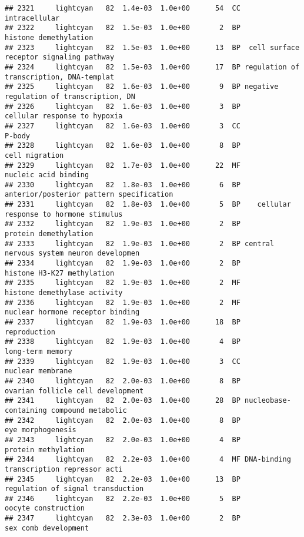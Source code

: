 \documentclass[]{article}
\begin{document}
\begin{verbatim}
## 2321     lightcyan   82  1.4e-03  1.0e+00      54  CC                            intracellular
## 2322     lightcyan   82  1.5e-03  1.0e+00       2  BP                    histone demethylation
## 2323     lightcyan   82  1.5e-03  1.0e+00      13  BP  cell surface receptor signaling pathway
## 2324     lightcyan   82  1.5e-03  1.0e+00      17  BP regulation of transcription, DNA-templat
## 2325     lightcyan   82  1.6e-03  1.0e+00       9  BP negative regulation of transcription, DN
## 2326     lightcyan   82  1.6e-03  1.0e+00       3  BP             cellular response to hypoxia
## 2327     lightcyan   82  1.6e-03  1.0e+00       3  CC                                   P-body
## 2328     lightcyan   82  1.6e-03  1.0e+00       8  BP                           cell migration
## 2329     lightcyan   82  1.7e-03  1.0e+00      22  MF                     nucleic acid binding
## 2330     lightcyan   82  1.8e-03  1.0e+00       6  BP anterior/posterior pattern specification
## 2331     lightcyan   82  1.8e-03  1.0e+00       5  BP    cellular response to hormone stimulus
## 2332     lightcyan   82  1.9e-03  1.0e+00       2  BP                    protein demethylation
## 2333     lightcyan   82  1.9e-03  1.0e+00       2  BP central nervous system neuron developmen
## 2334     lightcyan   82  1.9e-03  1.0e+00       2  BP               histone H3-K27 methylation
## 2335     lightcyan   82  1.9e-03  1.0e+00       2  MF             histone demethylase activity
## 2336     lightcyan   82  1.9e-03  1.0e+00       2  MF         nuclear hormone receptor binding
## 2337     lightcyan   82  1.9e-03  1.0e+00      18  BP                             reproduction
## 2338     lightcyan   82  1.9e-03  1.0e+00       4  BP                         long-term memory
## 2339     lightcyan   82  1.9e-03  1.0e+00       3  CC                         nuclear membrane
## 2340     lightcyan   82  2.0e-03  1.0e+00       8  BP        ovarian follicle cell development
## 2341     lightcyan   82  2.0e-03  1.0e+00      28  BP nucleobase-containing compound metabolic
## 2342     lightcyan   82  2.0e-03  1.0e+00       8  BP                        eye morphogenesis
## 2343     lightcyan   82  2.0e-03  1.0e+00       4  BP                      protein methylation
## 2344     lightcyan   82  2.2e-03  1.0e+00       4  MF DNA-binding transcription repressor acti
## 2345     lightcyan   82  2.2e-03  1.0e+00      13  BP        regulation of signal transduction
## 2346     lightcyan   82  2.2e-03  1.0e+00       5  BP                      oocyte construction
## 2347     lightcyan   82  2.3e-03  1.0e+00       2  BP                     sex comb development

\end{verbatim}
\end{document}
